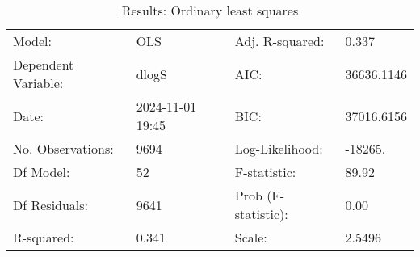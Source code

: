 \begin{table}
\caption{Results: Ordinary least squares}
\label{}
\begin{center}
\begin{tabular}{llll}
\hline
Model:              & OLS              & Adj. R-squared:     & 0.337       \\
Dependent Variable: & dlogS            & AIC:                & 36636.1146  \\
Date:               & 2024-11-01 19:45 & BIC:                & 37016.6156  \\
No. Observations:   & 9694             & Log-Likelihood:     & -18265.     \\
Df Model:           & 52               & F-statistic:        & 89.92       \\
Df Residuals:       & 9641             & Prob (F-statistic): & 0.00        \\
R-squared:          & 0.341            & Scale:              & 2.5496      \\
\hline
\end{tabular}
\end{center}


\end{table}
